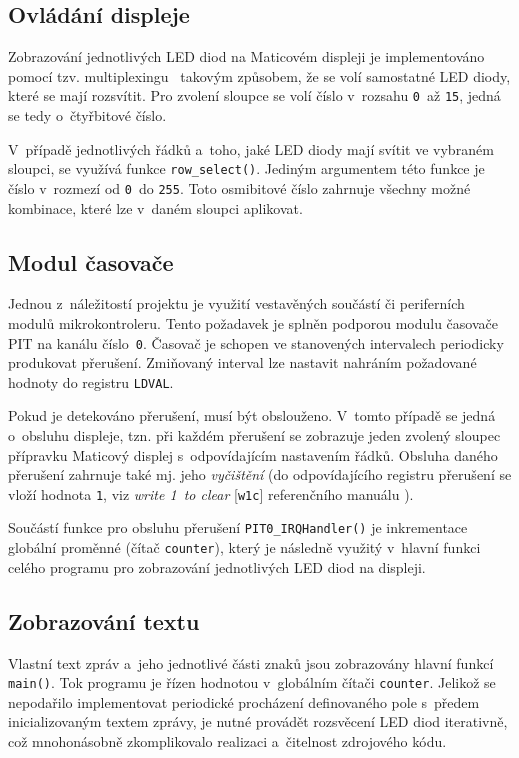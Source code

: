 \documentclass[a4paper, 11pt]{article}
\begin{document}
\subsection{Ovládání displeje}
    Zobrazování jednotlivých LED diod na Maticovém displeji je implementováno pomocí tzv. multiplexingu~\cite{manual} takovým způsobem, že se volí samostatné LED diody, které se mají rozsvítit.
    Pro zvolení sloupce se volí číslo v~rozsahu \texttt{0}~až \texttt{15}, jedná se tedy o~čtyřbitové číslo.
    
    V~případě jednotlivých řádků a~toho, jaké LED diody mají svítit ve vybraném sloupci, se využívá funkce \texttt{row\_select()}.
    Jediným argumentem této funkce je číslo v~rozmezí od \texttt{0}~do \texttt{255}.
    Toto osmibitové číslo zahrnuje všechny možné kombinace, které lze v~daném sloupci aplikovat.

\subsection{Modul časovače}
    Jednou z~náležitostí projektu je využití vestavěných součástí či periferních modulů mikrokontroleru.
    Tento požadavek je splněn podporou modulu časovače PIT na kanálu číslo~\texttt{0}.
    Časovač je schopen ve stanovených intervalech periodicky produkovat přerušení.
    Zmiňovaný interval lze nastavit nahráním požadované hodnoty do registru \texttt{LDVAL}.

    Pokud je detekováno přerušení, musí být obslouženo.
    V~tomto případě se jedná o~obsluhu displeje, tzn. při každém přerušení se zobrazuje jeden zvolený sloupec přípravku Maticový displej s~odpovídajícím nastavením řádků.
    Obsluha daného přerušení zahrnuje také mj. jeho \textit{vyčištění} (do odpovídajícího registru přerušení se vloží hodnota \texttt{1}, viz \textit{write 1~to clear} [\texttt{w1c}] referenčního manuálu \cite{manual}).

    Součástí funkce pro obsluhu přerušení \texttt{PIT0\_IRQHandler()} je inkrementace globální proměnné (čítač \texttt{counter}), který je následně využitý v~hlavní funkci celého programu pro zobrazování jednotlivých LED diod na displeji.

\subsection{Zobrazování textu}
\label{text}
    Vlastní text zpráv a~jeho jednotlivé části znaků jsou zobrazovány hlavní funkcí \texttt{main()}.
    Tok programu je řízen hodnotou v~globálním čítači \texttt{counter}.
    Jelikož se nepodařilo implementovat periodické procházení definovaného pole s~předem inicializovaným textem zprávy, je nutné provádět rozsvěcení LED diod iterativně, což mnohonásobně zkomplikovalo realizaci a~čitelnost zdrojového kódu.
\end{document}
